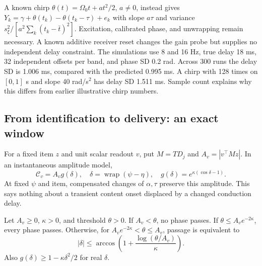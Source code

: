 \documentclass[submission,nolinenumbers]{esj}
\newcommand{\wrap}{\operatorname{wrap}}
\begin{document}
A known chirp $\theta(t)=\Omega_0t+at^2/2$, $a\ne0$, instead gives $Y_k=\gamma+\theta(t_k)-\theta(t_k-\tau)+e_k$ with slope $a\tau$ and variance $s_\xi^2/[a^2\sum_k(t_k-\bar t)^2]$. Excitation, calibrated phase, and unwrapping remain necessary. A known additive receiver reset changes the gain probe but supplies no independent delay constraint.
The simulations use 8 and 16 Hz, true delay 18 ms, 32 independent offsets per band, and phase SD 0.2 rad. Across 300 runs the delay SD is 1.006 ms, compared with the predicted 0.995 ms. A chirp with 128 times on $[0,1]$ s and slope 40 rad/s$^2$ has delay SD 1.511 ms. Sample count explains why this differs from earlier illustrative chirp numbers.

\subsection{From identification to delivery: an exact window}\label{sec:delivery}
For a fixed item $z$ and unit scalar readout $v$, put $M=TD_j$ and $A_v=|v^\top Mz|$. In an instantaneous amplitude model,
\begin{equation}
\mathcal C_v=A_vg(\delta),\quad \delta=\wrap(\psi-\eta),\quad
 g(\delta)=e^{\kappa(\cos\delta-1)}.\label{eq:delivered}
\end{equation}
At fixed $\psi$ and item, compensated changes of $\alpha,\tau$ preserve this amplitude. This says nothing about a transient content onset displaced by a changed conduction delay.
\begin{proposition}\label{prop:delivery}
Let $A_v\ge0$, $\kappa>0$, and threshold $\theta>0$. If $A_v<\theta$, no phase passes. If $\theta\le A_ve^{-2\kappa}$, every phase passes. Otherwise, for $A_ve^{-2\kappa}<\theta\le A_v$, passage is equivalent to
\begin{equation}
|\delta|\le\arccos\left(1+\frac{\log(\theta/A_v)}{\kappa}\right).
\label{eq:tolerance}
\end{equation}
Also $g(\delta)\ge1-\kappa\delta^2/2$ for real $\delta$.
\end{proposition}
\end{document}
